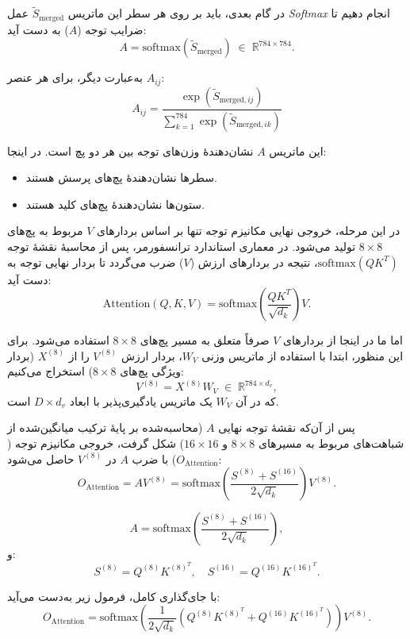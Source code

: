در گام بعدی، باید بر روی هر سطر این ماتریس \(\tilde{S}_{\text{merged}}\) عمل \textit{Softmax} انجام دهیم تا ضرایب توجه (\(A\)) به دست آید:
\begin{equation}
	A = \text{softmax}(\tilde{S}_{\text{merged}}) \; \in \; \mathbb{R}^{784 \times 784}.
\end{equation}


به‌عبارت دیگر، برای هر عنصر \(A_{ij}\):
\begin{equation}
	A_{ij} = \frac{\exp(\tilde{S}_{\text{merged}, ij})}{\sum_{k=1}^{784} \exp(\tilde{S}_{\text{merged}, ik})}
\end{equation}


این ماتریس \(A\) نشان‌دهندهٔ وزن‌های توجه بین هر دو پچ است. در اینجا:
\begin{itemize}
	\item سطرها نشان‌دهندهٔ پچ‌های پرسش هستند.
	\item ستون‌ها نشان‌دهندهٔ پچ‌های کلید هستند.
\end{itemize}

در این مرحله، خروجی نهایی مکانیزم توجه  تنها بر اساس بردارهای \(V\) مربوط به پچ‌های \(8 \times 8\) تولید می‌شود. در معماری استاندارد ترانسفورمر، پس از محاسبهٔ نقشهٔ توجه \(\text{softmax}(QK^T)\)، نتیجه در بردارهای ارزش (\(V\)) ضرب می‌گردد تا بردار نهایی توجه به دست آید:
\[
\text{Attention}(Q, K, V) = \text{softmax} \left( \frac{QK^T}{\sqrt{d_k}} \right) V.
\]

اما ما در اینجا از بردارهای \(V\) صرفاً متعلق به مسیر پچ‌های \(8 \times 8\) استفاده می‌شود. برای این منظور، ابتدا با استفاده از ماتریس وزنی \(W_V\)، بردار ارزش \(V^{(8)}\) را از \(X^{(8)}\) (بردار ویژگی پچ‌های \(8 \times 8\)) استخراج می‌کنیم:
\[
V^{(8)} = X^{(8)} W_V \; \in \; \mathbb{R}^{784 \times d_v},
\]
که در آن \(W_V\) یک ماتریس یادگیری‌پذیر با ابعاد \(D \times d_v\) است. 

پس از آن‌که نقشهٔ توجه نهایی \(A\) (محاسبه‌شده بر پایهٔ ترکیب میانگین‌شده از شباهت‌های مربوط به مسیرهای \(8 \times 8\) و \(16 \times 16\)) شکل گرفت، خروجی مکانیزم توجه (\(O_{\text{Attention}}\)) با ضرب \(A\) در \(V^{(8)}\) حاصل می‌شود:
\begin{equation}
	O_{\text{Attention}} = A V^{(8)} = \text{softmax} \left( \frac{S^{(8)} + S^{(16)}}{2 \sqrt{d_k}} \right) V^{(8)}.
\end{equation}

\[
A = \text{softmax} \left( \frac{S^{(8)} + S^{(16)}}{2 \sqrt{d_k}} \right),
\]
و:
\[
S^{(8)} = Q^{(8)} K^{(8)^T}, \quad S^{(16)} = Q^{(16)} K^{(16)^T}.
\]

با جای‌گذاری کامل، فرمول زیر به‌دست می‌آید:
\begin{equation}
	O_{\text{Attention}} = \text{softmax} \left( \frac{1}{2 \sqrt{d_k}} \left( Q^{(8)} K^{(8)^T} + Q^{(16)} K^{(16)^T} \right) \right) V^{(8)}.
\end{equation}


